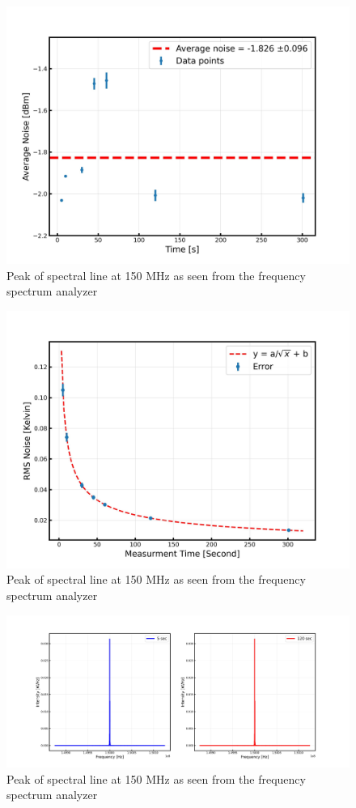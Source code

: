 \documentclass[12pt]{article}
\begin{document}
\begin{figure}[H]
\centering
\includegraphics[scale=.5]{fig/Exercise 1.91.jpg}
\caption{Peak of spectral line at 150 MHz as seen from the frequency spectrum analyzer}
\label{fig1.11}
\end{figure}

\begin{figure}[H]
\centering
\includegraphics[scale=.5]{fig/Exercise 1.92.jpg}
\caption{Peak of spectral line at 150 MHz as seen from the frequency spectrum analyzer}
\label{fig1.12}
\end{figure}

\begin{figure}[H]
\centering
\includegraphics[scale=.3]{fig/Exercise 1.93.jpg}
\caption{Peak of spectral line at 150 MHz as seen from the frequency spectrum analyzer}
\label{fig1.13}
\end{figure}
\end{document}
